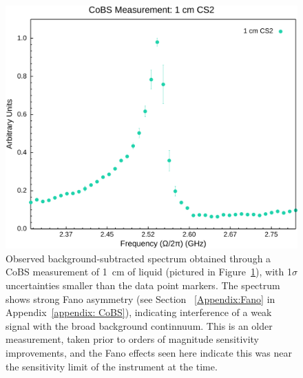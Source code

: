 \begin{figure}[t]
  \centering
  \hspace{-2em}\includegraphics[width=.85\textwidth]{figs/4-Raman/CoBS Measurement: 1 cm CS2.png}
  \caption[\ac{CoBS} measurement of \SI{1}{\centi\meter} liquid .]{Observed background-subtracted spectrum obtained through a \ac{CoBS} measurement of \SI{1}{\centi\meter} of liquid  (pictured in Figure~\ref{fig:Raman:1cmCS2}), with 1\(\sigma\) uncertainties smaller than the data point markers. The spectrum shows strong Fano asymmetry (see Section ~\ref{Appendix:Fano} in Appendix~\ref{appendix: CoBS}), indicating interference of a weak signal with the broad background continnuum. This is an older measurement, taken prior to orders of magnitude sensitivity improvements, and the Fano effects seen here indicate this was near the sensitivity limit of the instrument at the time.}
  \label{fig:Raman:1cmCS2}
\end{figure}

